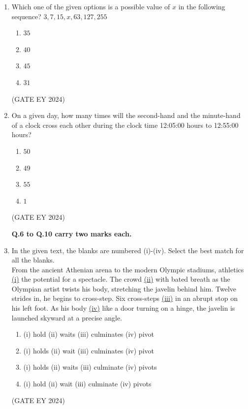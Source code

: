 \documentclass[journal]{IEEEtran}
\begin{document}
\begin{enumerate}
    \item Which one of the given options is a possible value of $x$ in the following sequence? $3, 7, 15, x, 63, 127, 255$
    \begin{multicols}{2}
    \begin{enumerate}
        \item $35$
        \item $40$
        \item $45$
        \item $31$
    \end{enumerate}
    \end{multicols}
\hfill{(GATE EY 2024)}

    \item On a given day, how many times will the second-hand and the minute-hand of a clock cross each other during the clock time 12:05:00 hours to 12:55:00 hours?
    \begin{multicols}{2}
    \begin{enumerate}
        \item $50$
        \item $49$
        \item $55$
        \item $1$
    \end{enumerate}
    \end{multicols}
\hfill{(GATE EY 2024)}

\textbf{Q.6 to Q.10 carry two marks each.}

\item In the given text, the blanks are numbered (i)-(iv). Select the best match for all the blanks. \\
From the ancient Athenian arena to the modern Olympic stadiums, athletics \underline{\hspace{0.5cm}(i)\hspace{0.5cm}} the potential for a spectacle. The crowd \underline{\hspace{0.5cm}(ii)\hspace{0.5cm}} with bated breath as the Olympian artist twists his body, stretching the javelin behind him. Twelve strides in, he begins to cross-step. Six cross-steps \underline{\hspace{0.5cm}(iii)\hspace{0.5cm}} in an abrupt stop on his left foot. As his body \underline{\hspace{0.5cm}(iv)\hspace{0.5cm}} like a door turning on a hinge, the javelin is launched skyward at a precise angle.
    \begin{enumerate}
        \item (i) hold (ii) waits (iii) culminates (iv) pivot
        \item (i) holds (ii) wait (iii) culminates (iv) pivot
        \item (i) holds (ii) waits (iii) culminate (iv) pivots
        \item (i) hold (ii) wait (iii) culminate (iv) pivots
    \end{enumerate}
\hfill{(GATE EY 2024)}


\end{enumerate}
\end{document}
